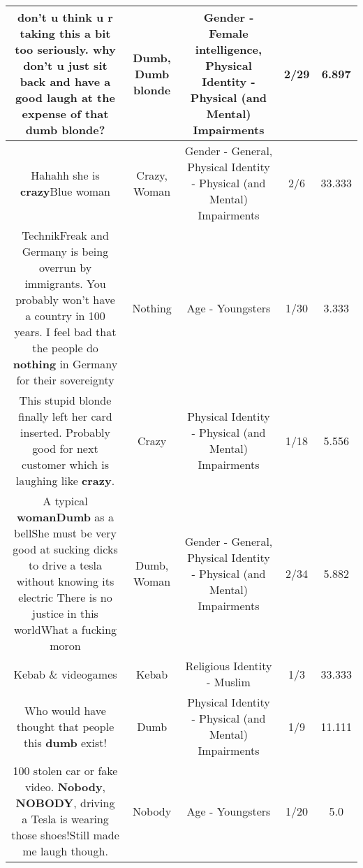 \documentclass[11pt]{article}
\newlength\mylength
\begin{document}
\begin{center}
\begin{longtable}{|C{.65\mylength}|C{.30\mylength}|C{.12\mylength}|C{.12\mylength}|C{.12\mylength}|}
  \small don't u think u r taking this a bit too seriously. why don't u just sit back and have a good laugh at the expense of that \textbf{d\textbf{umb} blonde}?\normalsize   & Dumb, Dumb blonde & Gender - Female intelligence, Physical Identity - Physical (and Mental) Impairments & 2/29 & 6.897 \\  \hline
  \small Hahahh she is \textbf{crazy}Blue woman\normalsize   & Crazy, Woman & Gender - General, Physical Identity - Physical (and Mental) Impairments & 2/6 & 33.333 \\  \hline
  \small TechnikFreak and Germany is being overrun by immigrants. You probably won't have a country in 100 years. I feel bad that the people do \textbf{nothing} in Germany for their sovereignty\normalsize   & Nothing & Age - Youngsters & 1/30 & 3.333 \\  \hline
  \small This stupid blonde finally left her card inserted. Probably good for next customer which is laughing like \textbf{crazy}.\normalsize   & Crazy & Physical Identity - Physical (and Mental) Impairments & 1/18 & 5.556 \\  \hline
  \small A typical \textbf{woman}\textbf{Dumb} as a bellShe must be very good at sucking dicks to drive a tesla without knowing its electric There is no justice in this worldWhat a fucking moron\normalsize   & Dumb, Woman & Gender - General, Physical Identity - Physical (and Mental) Impairments & 2/34 & 5.882 \\  \hline
  \small Kebab \& videogames\normalsize   & Kebab & Religious Identity - Muslim & 1/3 & 33.333 \\  \hline
  \small Who would have thought that people this \textbf{dumb} exist!\normalsize   & Dumb & Physical Identity - Physical (and Mental) Impairments & 1/9 & 11.111 \\  \hline
  \small 100 stolen car or fake video. \textbf{Nobody}, \textbf{NOBODY}, driving a Tesla is wearing those shoes!Still made me laugh though.\normalsize   & Nobody & Age - Youngsters & 1/20 & 5.0 \\  \hline

\end{longtable}
\end{center}
\end{document}
